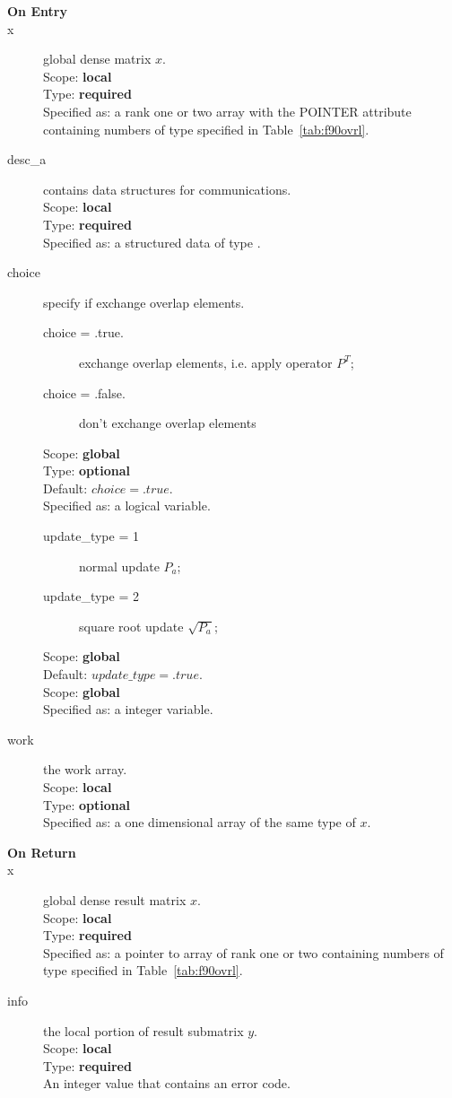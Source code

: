 \begin{description}
\item[\bf On Entry]
\item[x] global dense matrix $x$.\\
Scope: {\bf local} \\
Type: {\bf required} \\
Specified as:  a rank one or two array with the POINTER attribute
containing numbers of type specified in
Table~\ref{tab:f90ovrl}.
\item[desc\_a] contains data structures for communications.\\
Scope: {\bf local} \\
Type: {\bf required}\\
Specified as: a structured data of type \descdata.
\item[choice] specify if exchange overlap elements.
\begin{description}
\item[choice = .true.] exchange overlap elements, i.e. apply operator
$P^{T}$;
\item[choice = .false.] don't exchange overlap elements
\end{description}
Scope: {\bf global} \\
Type: {\bf optional} \\
Default: $choice = .true. $\\	
Specified as: a logical variable.
\begin{description}
\item[update\_type = 1] normal update $P_a$;
\item[update\_type = 2] square root update $\sqrt{P_a}$;
\end{description}
Scope: {\bf global} \\
Default: $update\_type = .true. $\\	
Scope: {\bf global} \\
Specified as: a integer variable.
\item[work] the work array. \\
Scope: {\bf local} \\
Type: {\bf optional}\\
Specified as: a one dimensional array of the same type of $x$.

\item[\bf On Return] 
\item[x] global dense result matrix $x$.\\
Scope: {\bf local} \\
Type: {\bf required} \\
Specified as: a pointer to array of rank one or two
containing numbers of type specified in
Table~\ref{tab:f90ovrl}.
\item[info] the local portion of result submatrix $y$.\\
Scope: {\bf local} \\
Type: {\bf required} \\
An integer value that contains an error code. 
\end{description}


